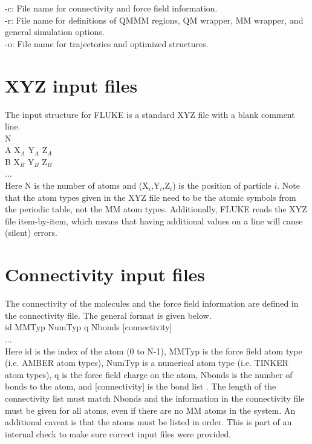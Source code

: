\documentclass[12pt]{report}
\begin{document}
-c: File name for connectivity and force field information. \\

-r: File name for definitions of QMMM regions, QM wrapper, MM wrapper,
and general simulation options. \\

-o: File name for trajectories and optimized structures. \\

\section{XYZ input files}

The input structure for FLUKE is a standard XYZ file with a blank comment
line. \\

N \\

A  X$_A$  Y$_A$  Z$_A$ \\
B  X$_B$  Y$_B$  Z$_B$ \\
... \\

Here N is the number of atoms and (X$_i$,Y$_i$,Z$_i$) is the position of
particle $i$. Note that the atom types given in the XYZ file need to be the
atomic symbols from the periodic table, not the MM atom types. Additionally,
FLUKE reads the XYZ file item-by-item, which means that having additional
values on a line will cause (silent) errors.

\section{Connectivity input files}

The connectivity of the molecules and the force field information are defined
in the connectivity file. The general format is given below. \\

id MMTyp NumTyp q Nbonds [connectivity] \\
... \\

Here id is the index of the atom (0 to N-1), MMTyp is the force field atom
type (i.e. AMBER atom types), NumTyp is a numerical atom type (i.e. TINKER
atom types), q is the force field charge on the atom, Nbonds is the number of
bonds to the atom, and [connectivity] is the bond list . The length of the
connectivity list must match Nbonds and the information in the connectivity
file must be given for all atoms, even if there are no MM atoms in the system.
An additional caveat is that the atoms must be listed in order. This is part
of an internal check to make sure correct input files were provided.
\end{document}
